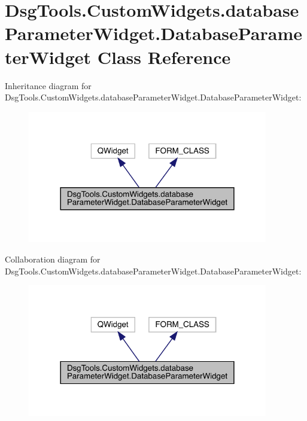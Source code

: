 \hypertarget{class_dsg_tools_1_1_custom_widgets_1_1database_parameter_widget_1_1_database_parameter_widget}{}\section{Dsg\+Tools.\+Custom\+Widgets.\+database\+Parameter\+Widget.\+Database\+Parameter\+Widget Class Reference}
\label{class_dsg_tools_1_1_custom_widgets_1_1database_parameter_widget_1_1_database_parameter_widget}


Inheritance diagram for Dsg\+Tools.\+Custom\+Widgets.\+database\+Parameter\+Widget.\+Database\+Parameter\+Widget\+:
\nopagebreak
\begin{figure}[H]
\begin{center}
\leavevmode
\includegraphics[width=297pt]{class_dsg_tools_1_1_custom_widgets_1_1database_parameter_widget_1_1_database_parameter_widget__inherit__graph}
\end{center}
\end{figure}


Collaboration diagram for Dsg\+Tools.\+Custom\+Widgets.\+database\+Parameter\+Widget.\+Database\+Parameter\+Widget\+:
\nopagebreak
\begin{figure}[H]
\begin{center}
\leavevmode
\includegraphics[width=297pt]{class_dsg_tools_1_1_custom_widgets_1_1database_parameter_widget_1_1_database_parameter_widget__coll__graph}
\end{center}
\end{figure}
